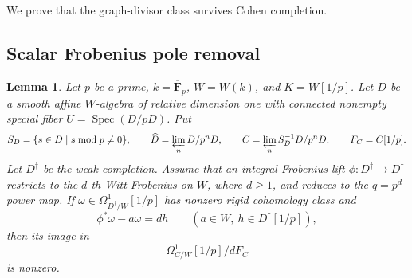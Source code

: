 \documentclass[11pt,a4paper]{amsart}
\numberwithin{equation}{section}
\newtheorem{lemma}[theorem]{Lemma}
\theoremstyle{definition}
\theoremstyle{remark}
\newcommand{\DtwoFF}{\mathbf{F}}
\newcommand{\Dtwowh}{\widehat}
\newcommand{\DtwoSpec}{\operatorname{Spec}}
\begin{document}
We prove that the graph-divisor class survives Cohen completion.

\subsection{Scalar Frobenius pole removal}

\begin{lemma}\label{d2:lem:scalar}
Let \(p\) be a prime, \(k=\overline{\DtwoFF}_p\), \(W=W(k)\), and
\(K=W[1/p]\).
Let \(D\) be a smooth affine \(W\)-algebra of relative dimension one
with connected nonempty special fiber \(U=\DtwoSpec(D/pD)\).
Put
\[
 S_D=\{s\in D\mid s\bmod p\ne0\},\qquad
 \Dtwowh D=\varprojlim_nD/p^nD,\qquad
 C=\varprojlim_nS_D^{-1}D/p^nD,\qquad F_C=C[1/p].
\]
Let \(D^\dagger\) be the weak completion.
Assume that an integral Frobenius lift
\(\phi\colon D^\dagger\to D^\dagger\) restricts to the \(d\)-th Witt
Frobenius on \(W\), where \(d\ge1\), and reduces to the
\(q=p^d\) power map.
If \(\omega\in\Omega^1_{D^\dagger/W}[1/p]\) has nonzero rigid
cohomology class and
\[
 \phi^*\omega-a\omega=dh
 \qquad(a\in W,\ h\in D^\dagger[1/p]),
\]
then its image in
\[
 \Omega^1_{C/W}[1/p]\big/dF_C
\]
is nonzero.
\end{lemma}
\end{document}
